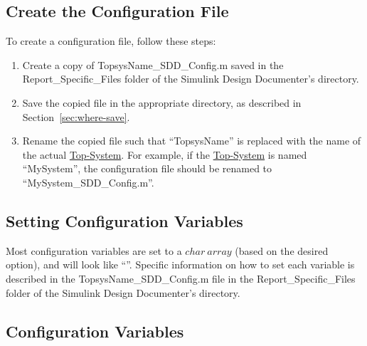 \documentclass{mcscert}
\newcommand{\sddtool}{Simulink Design Documenter}
\newcommand{\topsystemnolink}{Top-System} %
\newcommand{\topsystem}{\hyperref[def:topsystem]{\topsystemnolink{}}}
\begin{document}
	\subsection{Create the Configuration File}
	\label{ssec:create-config}
	To create a configuration file, follow these steps:
	 \begin{enumerate}
	   \item Create a copy of TopsysName\_SDD\_Config.m saved in the Report\_Specific\_Files folder of the \sddtool{}'s directory.
	   \item Save the copied file in the appropriate directory, as described in Section~\ref{sec:where-save}. 
	   \item Rename the copied file such that ``TopsysName'' is replaced with the name of the actual \topsystem{}. 
	   For example, if the	   \topsystem{} is named ``MySystem'', the configuration file should be renamed to ``MySystem\_SDD\_Config.m''.
	  \end{enumerate}

	\subsection{Setting Configuration Variables}
	\label{ssec:setting-config-vars}
	Most configuration variables are set to a $char~array$ (based on the desired option), and will look like ``''. 
	Specific information on how to set each variable is described in the TopsysName\_SDD\_Config.m file in the Report\_Specific\_Files folder of the \sddtool{}'s directory.
	  
	\subsection{Configuration Variables}
	\label{ssec:config-vars-list}
	
\end{document}
